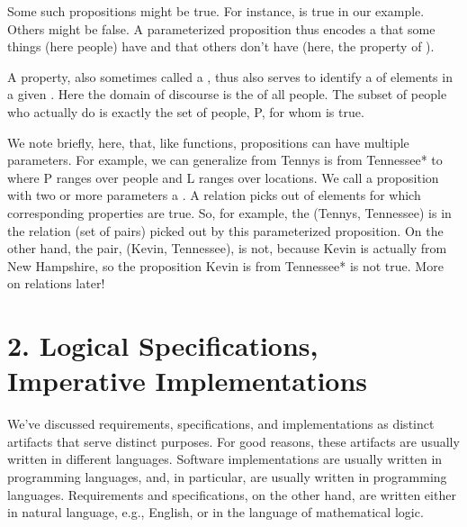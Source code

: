 \documentclass[letterpaper,10pt,english]{sphinxmanual}
\begin{document}
Some such propositions might be true. For instance,
 is true in our example. Others might be false. A
parameterized proposition thus encodes a  that some things
(here people) have and that others don’t have (here, the property of
).

A property, also sometimes called a , thus also serves to
identify a  of elements in a given . Here
the domain of discourse is the of all people. The subset of people who
actually do  is exactly the set of people, P, for whom
 is true.

We note briefly, here, that, like functions, propositions can have
multiple parameters. For example, we can generalize from  Tennys is from Tennessee* to  where P ranges over people and L ranges over locations. We
call a proposition with two or more parameters a . A
relation picks out  of elements for which corresponding
properties are true. So, for example, the  (Tennys, Tennessee)
is in the relation (set of  pairs) picked out by this
parameterized proposition. On the other hand, the pair, (Kevin,
Tennessee), is not, because Kevin is actually from New Hampshire, so
the proposition  Kevin is from Tennessee*
is not true. More on relations later!


\chapter{2. Logical Specifications, Imperative Implementations}
\label{\detokenize{02-logic-and-code::doc}}\label{\detokenize{02-logic-and-code:logical-specifications-imperative-implementations}}
We’ve discussed requirements, specifications, and implementations as
distinct artifacts that serve distinct purposes. For good reasons,
these artifacts are usually written in different languages. Software
implementations are usually written in programming languages, and, in
particular, are usually written in  programming languages.
Requirements and specifications, on the other hand, are written either
in natural language, e.g., English, or in the language of mathematical
logic.
\end{document}
